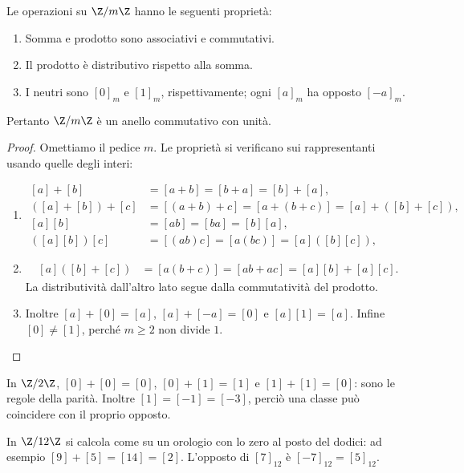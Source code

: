 \begin{proposizione}
Le operazioni su $\Z/m\Z$ hanno le seguenti proprietà:
\begin{enumerate}[label=\arabic*.]
\item Somma e prodotto sono associativi e commutativi.
\item Il prodotto è distributivo rispetto alla somma.
\item I neutri sono $[0]_m$ e $[1]_m$, rispettivamente; ogni $[a]_m$ ha opposto $[-a]_m$.
\end{enumerate}
Pertanto $\Z/m\Z$ è un anello commutativo con unità.
\end{proposizione}
\begin{proof}
Omettiamo il pedice $m$. Le proprietà si verificano sui rappresentanti usando quelle degli interi:
\begin{enumerate}[label=\arabic*.]
\item
\[
\begin{aligned}
[a]+[b]&=[a+b]=[b+a]=[b]+[a],\\
([a]+[b])+[c]&=[(a+b)+c]=[a+(b+c)]=[a]+([b]+[c]),\\
[a][b]&=[ab]=[ba]=[b][a],\\
([a][b])[c]&=[(ab)c]=[a(bc)]=[a]([b][c]),
\end{aligned}
\]
\item
\[
\begin{aligned}
[a]([b]+[c])&=[a(b+c)]=[ab+ac]=[a][b]+[a][c].
\end{aligned}
\]
La distributività dall'altro lato segue dalla commutatività del prodotto.
\item Inoltre $[a]+[0]=[a]$, $[a]+[-a]=[0]$ e $[a][1]=[a]$. Infine $[0]\ne[1]$, perché $m\ge2$ non divide $1$.
\end{enumerate}
\end{proof}

\begin{esempio}
In $\Z/2\Z$, $[0]+[0]=[0]$, $[0]+[1]=[1]$ e $[1]+[1]=[0]$: sono le regole della parità. Inoltre $[1]=[-1]=[-3]$, perciò una classe può coincidere con il proprio opposto.

In $\Z/12\Z$ si calcola come su un orologio con lo zero al posto del dodici: ad esempio $[9]+[5]=[14]=[2]$. L'opposto di $[7]_{12}$ è $[-7]_{12}=[5]_{12}$.
\end{esempio}

\begin{schema}
\end{schema}

